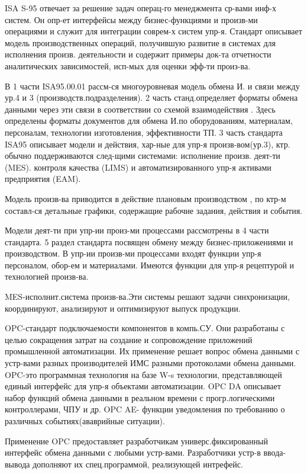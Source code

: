 \documentclass[unicode, 12pt, a4paper, oneside]{article}
\begin{document}
ISA S-95 отвечает за решение задач операц-го менеджмента ср-вами инф-х систем. Он опр-ет интерфейсы между бизнес-функциями и произв-ми операциями и служит для интеграции соврем-х систем упр-я. Стандарт описывает модель производственных операций, получившую развитие в системах для исполнения произв. деятельности и содержит примеры док-та отчетности аналитических зависимостей, исп-мых для оценки эфф-ти произ-ва.

В 1 части ISA95.00.01 рассм-ся многоуровневая модель обмена И. и связи между ур.4 и 3 (производств.подразделения). 2 часть станд.определяет форматы обмена данными через эти связи в соответствии со схемой взаимодействия . Здесь определены форматы документов для обмена И.по оборудованиям, материалам, персоналам, технологии изготовления, эффективности ТП. 3 часть стандарта ISA95 описывает модели и действия, хар-ные для упр-я произв-вом(ур.3), ктр. обычно поддерживаются след-щими системами: исполнение произв. деят-ти (MES). контроля качества (LIMS) и автоматизированного упр-я активами предприятия (EAM).

Модель произв-ва приводится в действие плановым производством , по ктр-м составл-ся детальные графики, содержащие рабочие задания, действия и события.

Модели деят-ти при упр-ии произ-ми процессами рассмотрены в 4 части стандарта. 5 раздел стандарта посвящен обмену между бизнес-приложениями и производством. В упр-ии произв-ми процессами входят функции упр-я персоналом, обор-ем и материалами. Имеются функции для упр-я рецептурой и технологией произв-ва.

MES-исполнит.система произв-ва.Эти системы решают задачи синхронизации, координируют, анализируют и оптимизируют выпуск продукции.

OPC-стандарт подключаемости компонентов в компь.СУ. Они разработаны с целью сокращения затрат на создание и сопровождение приложений промышленной автоматизации. Их применение решает вопрос обмена данными с устр-вами разных производителей ИМС разными протоколами обмена данными. OPC-это программная технология на базе W-s технологии, представляющей единый интерфейс для упр-я объектами автоматизации. OPC DA описывает набор функций обмена данными в реальном времени с прогр.логическими контроллерами, ЧПУ и др. OPC AE- функции уведомления по требованию о различных событиях(ававрийные ситуации).

Применение OPC предоставляет разработчикам универс.фиксированный интерфейс обмена данными с любыми устр-вами. Разработчики устр-в ввода-вывода дополняют их спец.программой, реализующей интрефейс.
\end{document}
